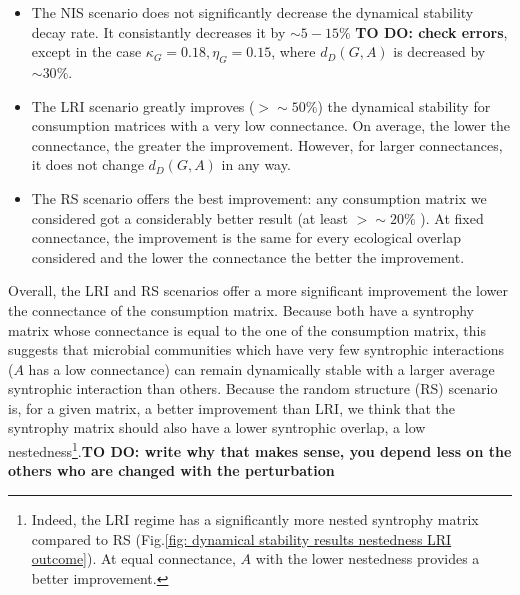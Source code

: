 \documentclass[12pt, titlepage]{report}
\begin{document}
\begin{itemize}
\item The NIS scenario does not significantly decrease the dynamical stability decay rate. It consistantly decreases it by $\sim 5-15\%$ \textbf{TO DO: check errors}, except in the case $\kappa_G = 0.18, \eta_G=0.15$, where $d_D(G,A)$ is decreased by $\sim 30\%$.
\item The LRI scenario greatly improves ($> \sim 50\%$) the dynamical stability for consumption matrices with a very low connectance. On average, the lower the connectance, the greater the improvement. However, for larger connectances, it does not change $d_D(G,A)$ in any way.
\item The RS scenario offers the best improvement: any consumption matrix we considered got a considerably better result (at least $>\sim 20 \%$ ). At fixed connectance, the improvement is the same for every ecological overlap considered and the lower the connectance the better the improvement.
\end{itemize}
Overall, the LRI and RS scenarios offer a more significant improvement the lower the connectance of the consumption matrix. Because both have a syntrophy matrix whose connectance is equal to the one of the consumption matrix, this suggests that microbial communities which have very few syntrophic interactions (\ie $A$ has a low connectance) can remain dynamically stable with a larger average syntrophic interaction than others. Because the random structure (RS) scenario is, for a given matrix, a better improvement than LRI, we think that the syntrophy matrix should also have a lower syntrophic overlap, \ie a low nestedness\footnote{Indeed, the LRI regime has a significantly more nested syntrophy matrix compared to RS (Fig.\ref{fig: dynamical stability results nestedness LRI outcome}). At equal connectance, $A$ with the lower nestedness provides a better improvement.}.\textbf{TO DO: write why that makes sense, you depend less on the others who are changed with the perturbation}
\end{document}

